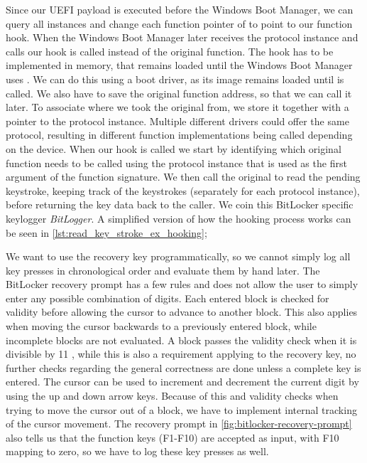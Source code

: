 Since our \ac{UEFI} payload is executed before the Windows Boot Manager, we can query all  instances and change each function pointer of  to point to our function hook.
When the Windows Boot Manager later receives the protocol instance and calls  our hook is called instead of the original function.
The hook has to be implemented in memory, that remains loaded until the Windows Boot Manager uses .
We can do this using a boot driver, as its image remains loaded until  is called.
We also have to save the original function address, so that we can call it later.
To associate where we took the original from, we store it together with a pointer to the protocol instance.
Multiple different drivers could offer the same protocol, resulting in different function implementations being called depending on the device.
When our hook is called we start by identifying which original function needs to be called using the protocol instance that is used as the first argument of the  function signature.
We then call the original to read the pending keystroke, keeping track of the keystrokes (separately for each protocol instance), before returning the key data back to the caller.
We coin this BitLocker specific keylogger \emph{BitLogger}.
A simplified version of how the hooking process works can be seen in \autoref{lst:read_key_stroke_ex_hooking};

\vspace{1em}



We want to use the recovery key programmatically, so we cannot simply log all key presses in chronological order and evaluate them by hand later.
The BitLocker recovery prompt has a few rules and does not allow the user to simply enter any possible combination of digits.
Each entered block is checked for validity before allowing the cursor to advance to another block.
This also applies when moving the cursor backwards to a previously entered block, while incomplete blocks are not evaluated.
A block passes the validity check when it is divisible by 11 \cite[Section 9]{windows-internals-6-part2}, while this is also a requirement applying to the recovery key, no further checks regarding the general correctness are done unless a complete key is entered.
The cursor can be used to increment and decrement the current digit by using the up and down arrow keys.
Because of this and validity checks when trying to move the cursor out of a block, we have to implement internal tracking of the cursor movement.
The recovery prompt in \autoref{fig:bitlocker-recovery-prompt} also tells us that the function keys (F1-F10) are accepted as input, with F10 mapping to zero, so we have to log these key presses as well.

